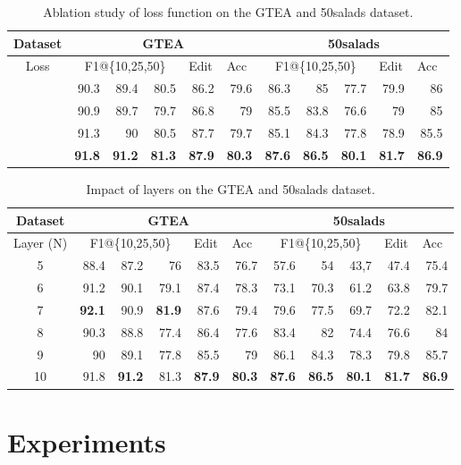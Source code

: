 \documentclass[runningheads]{llncs}
\begin{document}
\begin{table*}[htbp]
	\centering
	\caption{Ablation study of loss function on the GTEA and 50salads dataset.}
\begin{tabular}{crrrrrrrrrr}
		\toprule
		Dataset & \multicolumn{5}{c}{GTEA}              & \multicolumn{5}{c}{50salads} \\
		\midrule
		Loss & \multicolumn{3}{c}{F1@\{10,25,50\}} & \multicolumn{1}{l}{Edit} & \multicolumn{1}{l}{Acc} & \multicolumn{3}{c}{F1@\{10,25,50\}} & \multicolumn{1}{l}{Edit} & \multicolumn{1}{l}{Acc} \\
		\midrule
		 & 90.3  & 89.4  & 80.5    & 86.2  & 79.6  & 86.3  & 85    & 77.7  & 79.9  & 86 \\
		 & 90.9  & 89.7  & 79.7  & 86.8  & 79  & 85.5    & 83.8  & 76.6  & 79  & 85 \\
		  & 91.3 & 90  & 80.5 & 87.7  & 79.7    & 85.1  & 84.3  & 77.8  & 78.9 & 85.5 \\
		 & \textbf{91.8}  & \textbf{91.2} & \textbf{81.3}  & \textbf{87.9} & \textbf{80.3}  & \textbf{87.6} & \textbf{86.5} & \textbf{80.1} & \textbf{81.7} & \textbf{86.9} \\
		\bottomrule
	\end{tabular}\label{tab4}\end{table*}\begin{table*}[ht]
	\centering
	\caption{Impact of layers on the GTEA and 50salads dataset.}
\begin{tabular}{crrrrrrrrrr}
		\toprule
		Dataset & \multicolumn{5}{c}{GTEA}              & \multicolumn{5}{c}{50salads} \\
		\midrule
		Layer (N) & \multicolumn{3}{c}{F1@\{10,25,50\}} & \multicolumn{1}{l}{Edit} & \multicolumn{1}{l}{Acc} & \multicolumn{3}{c}{F1@\{10,25,50\}} & \multicolumn{1}{l}{Edit} & \multicolumn{1}{l}{Acc} \\
		\midrule
		5 & 88.4  & 87.2  & 76    & 83.5  & 76.7  & 57.6  & 54   & 43,7  & 47.4  & 75.4 \\
		6 & 91.2  & 90.1  & 79.1  & 87.4  & 78.3  & 73.1    & 70.3  & 61.2  & 63.8  & 79.7 \\
		7  & \textbf{92.1} & 90.9  & \textbf{81.9} & 87.6  & 79.4    & 79.6  & 77.5  & 69.7  & 72.2 & 82.1 \\
		8 & 90.3  & 88.8  & 77.4  & 86.4  & 77.6  & 83.4  & 82 & 74.4  & 76.6 & 84 \\
		9 & 90 & 89.1 & 77.8  & 85.5  & 79 & 86.1  & 84.3  & 78.3  & 79.8  & 85.7 \\
		10 & 91.8  & \textbf{91.2} & 81.3  & \textbf{87.9} & \textbf{80.3}  & \textbf{87.6} & \textbf{86.5} & \textbf{80.1} & \textbf{81.7} & \textbf{86.9} \\
		\bottomrule
	\end{tabular}\label{tab2}\end{table*}\section{Experiments}
\end{document}
